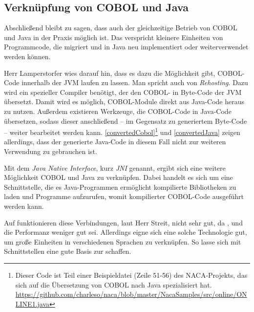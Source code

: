 \subsection*{Verknüpfung von COBOL und Java} \label{cobolandjava}

Abschließend bleibt zu sagen, dass auch der gleichzeitige Betrieb von COBOL und Java in der Praxis möglich ist. Das verspricht kleinere Einheiten von Programmcode, die migriert und in Java neu implementiert oder weiterverwendet werden können.


Herr Lamperstorfer wies darauf hin, dass es dazu die Möglichkeit gibt, COBOL-Code innerhalb der JVM laufen zu lassen. Man spricht auch von \textit{Rehosting}. Dazu wird ein spezieller Compiler benötigt, der den COBOL- in Byte-Code der JVM übersetzt. Damit wird es möglich, COBOL-Module direkt aus Java-Code heraus zu nutzen. Außerdem existieren Werkzeuge, die COBOL-Code in Java-Code übersetzen, sodass dieser anschließend -- im Gegensatz zu generiertem Byte-Code -- weiter bearbeitet werden kann. \autoref{convertedCobol}\footnote{\label{convertedFootnote} Dieser Code ist Teil einer Beispieldatei (Zeile 51-56) des NACA-Projekts, das sich auf die Übersetzung von COBOL nach Java spezialisiert hat.\\\url{https://github.com/charleso/naca/blob/master/NacaSamples/src/online/ONLINE1.java} \visitedOn} und \autoref{convertedJava} zeigen allerdings, dass der generierte Java-Code in diesem Fall nicht zur weiteren Verwendung zu gebrauchen ist.

Mit dem \textit{Java Native Interface}, kurz \textit{JNI} genannt, ergibt sich eine weitere Möglichkeit COBOL und Java zu verknüpfen. Dabei handelt es sich um eine Schnittstelle, die es Java-Programmen ermöglicht kompilierte Bibliotheken zu laden und Programme aufzurufen, womit kompilierter COBOL-Code ausgeführt werden kann.

Auf  funktionieren diese Verbindungen, laut Herr Streit, nicht sehr gut, da ,  und die Performanz weniger gut sei. Allerdings eigne sich eine solche Technologie gut, um große Einheiten in verschiedenen Sprachen zu verknüpfen. So lasse sich mit  Schnittstellen eine gute Basis zur  schaffen.